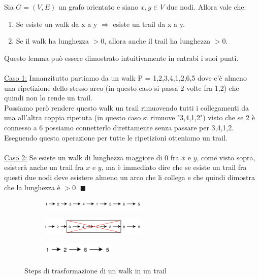 \newpage
\begin{lemma}\label{lemma-1}
    Sia $G=(V,E)$ un grafo orientato e siano $x,y \in V$ due nodi. Allora vale che:
    \begin{enumerate}
        \item Se esiste un walk da x a y $\Longrightarrow$ esiste un trail da x a y.
        \item Se il walk ha lunghezza $>0$, allora anche il trail ha lunghezza $>0$.
    \end{enumerate}
\end{lemma}
\begin{demostration}
Questo lemma può essere dimostrato intuitivamente in entrabi i suoi punti. \\ \\
\underline{Caso 1:} Innanzitutto partiamo da un walk P = 1,2,3,4,1,2,6,5 dove c'è almeno una ripetizione dello stesso arco (in questo caso si passa 2 volte fra 1,2) che quindi non lo rende un trail.\\
Possiamo però rendere questo walk un trail rimuovendo tutti i collegamenti da una all'altra coppia ripetuta (in questo caso si rimuove "3,4,1,2") visto che se 2 è connesso a 6 possiamo connetterlo direttamente senza passare per 3,4,1,2. Eseguendo questa operazione per tutte le ripetizioni otteniamo un trail. \\\\
\underline{Caso 2:} Se esiste un walk di lunghezza maggiore di 0 fra $x$ e $y$, come visto sopra, esisterà anche un trail fra $x$ e $y$, ma è immediato dire che se esiste un trail fra questi due nodi deve esistere almeno un arco che li collega e che quindi dimostra che la lunghezza è $>0$.
$\blacksquare$
\end{demostration}
\begin{figure}[h!]
    \centering
    \begin{subfigure}{.3\textwidth}
        \centering
        \includegraphics[width=5cm]{images/lemma-walk-trail-3.png}
        \caption{}
    \end{subfigure}
    \hfill
    \begin{subfigure}{.3\textwidth}
        \centering
        \includegraphics[width=5cm]{images/lemma-walk-trail-2.png}
        \caption{}
    \end{subfigure}
    \hfill
    \begin{subfigure}{.3\textwidth}
        \centering
        \includegraphics[width=3.5cm]{images/lemma-walk-trail-1.png}
        \caption{}
    \end{subfigure}
    \vspace{-5pt}
    \caption{Steps di trasformazione di un walk in un trail}
\end{figure}

